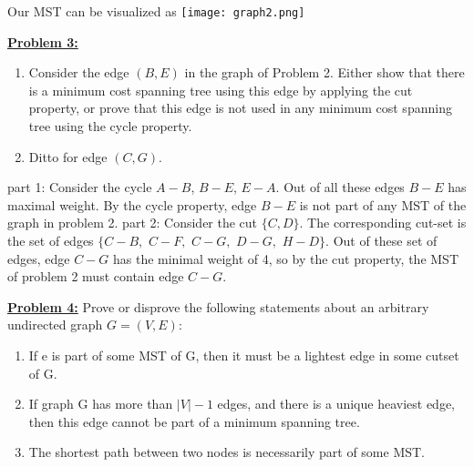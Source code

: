 \documentclass[11pt]{article}
\begin{document}
\begin{flushleft}
\begin{tabular}{ | p{2cm} | p{2cm} | p{5cm} | }
	\end{tabular}
	\newline
	\newline
	Our MST can be visualized as \newline
	\texttt{[image: graph2.png]}
	\newline
	\item\textbf{\underline{Problem 3:}} \begin{enumerate}
		\item
		Consider the edge $(B,E)$ in the graph of Problem 2.
		Either show that there is a minimum cost spanning tree using
		this edge by applying the cut property, or
		prove that this edge is not used in any minimum cost
		spanning tree using the cycle property.
		\item
		Ditto for edge $(C,G)$.
	\end{enumerate}
	{part 1:} Consider the cycle $A - B$, $B - E$, $E - A$. Out of all these edges $B - E$ has maximal weight. By the cycle property, edge $B - E$ is not part of any MST of the graph in problem 2. 
	\newline
	\newline
	{part 2:} Consider the cut $\lbrace C, D \rbrace$. The corresponding cut-set is the set of edges \newline $\lbrace$$C - B,$ $C - F,$ $C - G,$ $D - G,$ $H - D \rbrace$. Out of these set of edges, edge $C - G$ has the minimal weight of 4, so by the cut property, the MST of problem 2 must contain edge $C - G$. 
	\newline
	\newpage
	\item\textbf{\underline{Problem 4:}} Prove or disprove the following statements about an
	arbitrary undirected graph $G=(V,E)$:
	\begin{enumerate}
		\item If e is part of some MST of G, then it must be a lightest edge
		in some cutset of G.
		\item If graph G has more than $|V | - 1$ edges, and there is a unique
		heaviest edge, then this edge cannot be part of a minimum spanning
		tree. 
		\item The shortest path between two nodes is necessarily part of some MST.
	\end{enumerate}
	
\end{flushleft}
\end{document}
